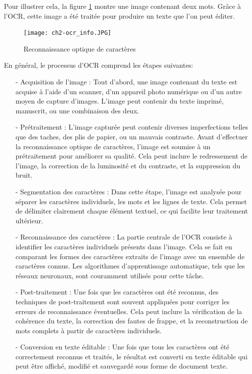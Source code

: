 Pour illustrer cela, la figure \ref{fig:ch2-ocr_info} montre une image contenant deux mots. Grâce à l'OCR, cette image a été traitée pour produire un texte que l'on peut éditer.

\begin{figure}[H]
	\centering
	\texttt{[image: ch2-ocr\_info.JPG]}
	\caption{Reconnaissance optique de caractères}
    \label{fig:ch2-ocr_info}
\end{figure}
En général, le processus d'OCR comprend les étapes suivantes:
\begin{itemize}
    \item [-] Acquisition de l'image : Tout d'abord, une image contenant du texte est acquise à l'aide d'un scanner, d'un appareil photo numérique ou d'un autre moyen de capture d'images. L'image peut contenir du texte imprimé, manuscrit, ou une combinaison des deux.
    \item [-] Prétraitement : L'image capturée peut contenir diverses imperfections telles que des taches, des plis de papier, ou un mauvais contraste. Avant d'effectuer la reconnaissance optique de caractères, l'image est soumise à un prétraitement pour améliorer sa qualité. Cela peut inclure le redressement de l'image, la correction de la luminosité et du contraste, et la suppression du bruit.
    \item [-] Segmentation des caractères : Dans cette étape, l'image est analysée pour séparer les caractères individuels, les mots et les lignes de texte. Cela permet de délimiter clairement chaque élément textuel, ce qui facilite leur traitement ultérieur.
    \item [-] Reconnaissance des caractères : La partie centrale de l'OCR consiste à identifier les caractères individuels présents dans l'image. Cela se fait en comparant les formes des caractères extraits de l'image avec un ensemble de caractères connus. Les algorithmes d'apprentissage automatique, tels que les réseaux neuronaux, sont couramment utilisés pour cette tâche.
    \item [-] Post-traitement : Une fois que les caractères ont été reconnus, des techniques de post-traitement sont souvent appliquées pour corriger les erreurs de reconnaissance éventuelles. Cela peut inclure la vérification de la cohérence du texte, la correction des fautes de frappe, et la reconstruction de mots complets à partir de caractères individuels.
    \item [-] Conversion en texte éditable : Une fois que tous les caractères ont été correctement reconnus et traités, le résultat est converti en texte éditable qui peut être affiché, modifié et sauvegardé sous forme de document texte.
\end{itemize}

